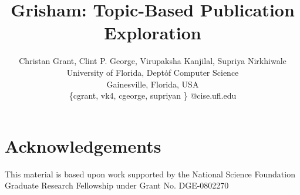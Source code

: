 \documentclass{sig-alternate}
\newcommand{\system}{Grisham\xspace}
\begin{document}
\title{\system: Topic-Based Publication Exploration}

\author{Christan Grant, Clint P. George, Virupaksha Kanjilal, Supriya Nirkhiwale \\
				University of Florida, Dept\. of Computer Science \\
				Gainesville, Florida, USA \\
				\{cgrant, vk4, cgeorge, supriyan \} @cise.ufl.edu
}

\maketitle























\section{Acknowledgements}
This material is based upon work supported by the National Science Foundation 
Graduate Research Fellowship under Grant No. DGE-0802270



\begin{small}

\end{small}
\end{document}

